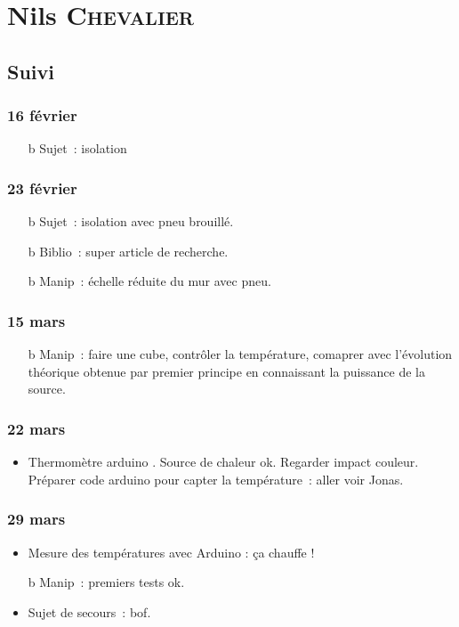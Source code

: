 \documentclass[a4paper, 11pt, final, garamond]{book}
\begin{document}
\chapter{Nils \textsc{Chevalier}}
\label{ch:chevalier}

\section{Suivi}
\subsection{16 février}
\begin{itemize}
	\item[b]{Sujet}~: isolation
\end{itemize}

\subsection{23 février}
\begin{itemize}
	\item[b]{Sujet}~: isolation avec pneu brouillé.
	\item[b]{Biblio}~: super article de recherche.
	\item[b]{Manip}~: échelle réduite du mur avec pneu.
\end{itemize}

\subsection{15 mars}
\begin{itemize}
	\item[b]{Manip}~: faire une cube, contrôler la température, comaprer avec
	l'évolution théorique obtenue par premier principe en connaissant la puissance
	de la source.
\end{itemize}

\subsection{22 mars}
\begin{itemize}
	\item Thermomètre arduino . Source de chaleur ok. Regarder
	      impact couleur. Préparer code arduino pour capter la température~: aller
	      voir Jonas.
\end{itemize}

\subsection{29 mars}
\begin{itemize}
	\item Mesure des températures avec Arduino : ça chauffe !
	      \item[b]{Manip}~: premiers tests ok.
	\item Sujet de secours~: bof.
\end{itemize}
\end{document}
